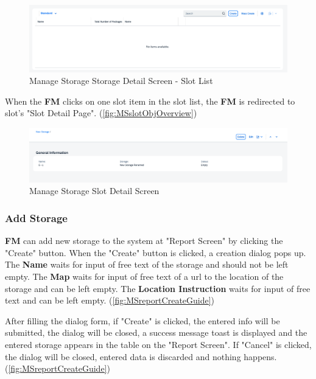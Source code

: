 \begin{figure}[H] %
	\centering
	\includegraphics[width=1\linewidth]{images/user_doc/storage/StorageObjectPage/slotList.png}
	\caption{Manage Storage Storage Detail Screen - Slot List}
	\label{fig:MSstorageObjSlotList}
\end{figure}

\bigskip

When the \textbf{FM} clicks on one slot item in the slot list, the \textbf{FM} is redirected to slot's "Slot Detail Page". 
(\autoref{fig:MSslotObjOverview})

\begin{figure}[H] %
	\centering
	\includegraphics[width=1\linewidth]{images/user_doc/storage/SlotObjectPage/slotObjOverview.png}
	\caption{Manage Storage Slot Detail Screen}
	\label{fig:MSslotObjOverview}
\end{figure}


\subsubsection{Add Storage}

\textbf{FM} can add new storage to the system at "Report Screen" by clicking the "Create" button.
When the "Create" button is clicked, a creation dialog pops up. The \textbf{Name} waits for input of free text of the storage and should not be left empty. The \textbf{Map} waits for input of free text of a url to the location of the storage and can be left empty. The \textbf{Location Instruction} waits for input of free text and can be left empty.
(\autoref{fig:MSreportCreateGuide})

After filling the dialog form, if "Create" is clicked, the entered info will be submitted, the dialog will be closed, a success message toast is displayed and the entered storage appears in the table on the "Report Screen". If "Cancel" is clicked, the dialog will be closed, entered data is discarded and nothing happens.
(\autoref{fig:MSreportCreateGuide})

